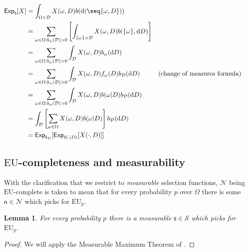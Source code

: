 \documentclass[a4paper]{article}
\newtheorem{lemma}[theorem]{Lemma}
\newcommand\Exp{\mathsf{Exp}}
\newcommand\EU{\mathrm{EU}}
\newcommand{\D}{\mathcal{D}}
\newcommand{\Decs}{\mathcal{D}}
\renewcommand\S{\mathcal{S}}
\newcommand\s{\mathsf{s}}
\newcommand{\n}{\mathsf{n}}
\renewcommand{\nu}{\n}
\newcommand\Nu{\mathcal{N}}
\renewcommand{\color}[1]{}
\newenvironment{colored}[1]{\leavevmode\color{#1}}{}
\newcommand\SetDelimiter[1][]{
	\nonscript\,#1\vert \allowbreak \nonscript\,\mathopen{}}
\providecommand\given{\SetDelimiter}
\newcommand*\diff{\mathop{}\!\mathrm{d}}
\newenvironment{CCM rewritten}
{\begingroup\color{blue}} %
{\endgroup}              %
\begin{document}
\begin{colored}{violet}
\begin{colored}{red}
\begin{align}
	\Exp_b[X]&=\int_{\Omega\times\Decs} X(\omega, D) b(\diff (\seq{\omega,D}))\\
		&=\sum_{\omega\in\Omega:b_\omega(\Decs)>0}\left[\int_{\{\omega\}\times \D} X(\omega,D) {b(\{\omega\},\diff D)}\right]\\
	&=\sum_{\omega\in\Omega:b_\omega(\Decs)>0}\int_\D X(\omega,D) b_\omega (\diff D)\\
	&=\sum_{\omega\in\Omega:b_\omega(\Decs)>0}\int_\D X(\omega,D) f_\omega(D) b_\D(\diff D)&&\text{(change of measures formula)}\\
	&=\sum_{\omega\in\Omega:b_\omega(\Decs)>0}\int_\D X(\omega,D) b(\omega |D) b_\D(\diff D)\\
		&=\int_\D \left[\sum_{\omega\in\Omega} X(\omega,D) b(\omega |D)\right] b_\D(\diff D)\\
		&=\Exp_{b_\D}[\Exp_{b(\cdot|D)}[X(\cdot,D)]]
\end{align}


%
%
%
%
%
%
%
\end{colored}




\subsection{$\EU$-completeness and measurability}

With the clarification that we restrict to \emph{measurable} selection functions, $\Nu$ being $\EU$-complete is taken to mean that for every probability $p$ over $\Omega$ there is some $\nu\in\Nu$ which picks for $\EU_p$. 

\begin{lemma}\label{thm:EU-complete-measurable}
	For every probability $p$ there is a measurable $\s\in\S$ which picks for $\EU_p$. 
\end{lemma}
\begin{proof}
	We will apply the Measurable Maximum Theorem of \citet[Theorem 18.19]{aliprantis2006infinite}.
	

\end{proof}
\end{colored}
\end{document}
